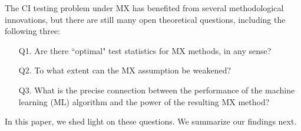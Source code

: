 \documentclass[12pt]{article}
\theoremstyle{definition}
\theoremstyle{remark}
\newcommand{\prx}{\bm X}
\newcommand{\srx}{X}
\newcommand{\prz}{\bm Z}
\newcommand{\srz}{Z}
\newcommand{\srxk}{\widetilde X}
\newcommand{\pry}{{\bm Y}}
\newcommand{\sry}{Y}
\begin{document}
The CI testing problem under MX has benefited from several methodological innovations, but there are still many open theoretical questions, including the following three:
\begin{enumerate}
	\item[Q1.] Are there ``optimal" test statistics for MX methods, in any sense?
	\item[Q2.] To what extent can the MX assumption be weakened?
	\item[Q3.] What is the precise connection between the performance of the machine learning (ML) algorithm and the power of the resulting MX method?
\end{enumerate}
In this paper, we shed light on these questions. We summarize our findings next.


\end{document}
